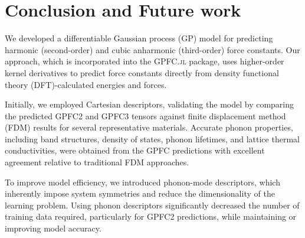 
\section{Conclusion and Future work} \label{sec:3.4}

We developed a differentiable Gaussian process (GP) model for predicting harmonic (second-order) and cubic anharmonic (third-order) force constants. Our approach, which is incorporated into the \textsc{GPFC.jl} package, uses higher-order kernel derivatives to predict force constants directly from density functional theory (DFT)-calculated energies and forces.

Initially, we employed Cartesian descriptors, validating the model by comparing the predicted GPFC2 and GPFC3 tensors against finite displacement method (FDM) results for several representative materials. Accurate phonon properties, including band structures, density of states, phonon lifetimes, and lattice thermal conductivities, were obtained from the GPFC predictions with excellent agreement relative to traditional FDM approaches.

To improve model efficiency, we introduced phonon-mode descriptors, which inherently impose system symmetries and reduce the dimensionality of the learning problem. Using phonon descriptors significantly decreased the number of training data required, particularly for GPFC2 predictions, while maintaining or improving model accuracy.


